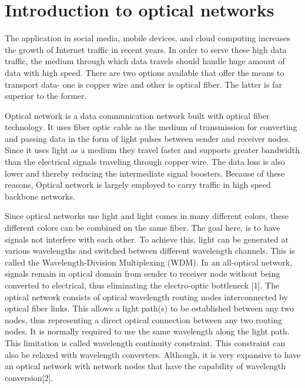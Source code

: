 
\noindent 

\section{Introduction to optical networks}

The application in social media, mobile devices, and cloud computing increases the growth of Internet traffic in recent years. In order to serve these high data traffic, the medium through which data travels should handle huge amount of data with high speed. There are two options available that offer the means to transport data- one is copper wire and other is optical fiber. The latter is far superior to the former.

Optical network is a data communication network built with optical fiber technology. It uses fiber optic cable as the medium of transmission for converting and passing data in the form of light pulses between sender and receiver nodes. Since it uses light as a medium they travel faster and supports greater bandwidth than the electrical signals traveling through copper wire. The data loss is also lower and thereby reducing the intermediate signal boosters. Because of these reasons, Optical network is largely employed to carry traffic in high speed backbone networks.

Since optical networks use light and light comes in many different colors, these different colors can be combined on the same fiber. The goal here, is to have signals not interfere with each other. To achieve this, light can be generated at various wavelengths and switched between different wavelength channels. This is called the Wavelength-Division Multiplexing (WDM). In an all-optical network, signals remain in optical domain from sender to receiver node without being converted to electrical, thus eliminating the electro-optic bottleneck [1]. The optical network consists of optical wavelength routing nodes interconnected by optical fiber links. This allows a light path(s) to be established between any two nodes, thus representing a direct optical connection between any two routing nodes. It is normally required to use the same wavelength along the light path. This limitation is called wavelength continuity constraint. This constraint can also be relaxed with wavelength converters. Although, it is very expansive to have an optical network with network nodes that have the capability of wavelength conversion[2].

